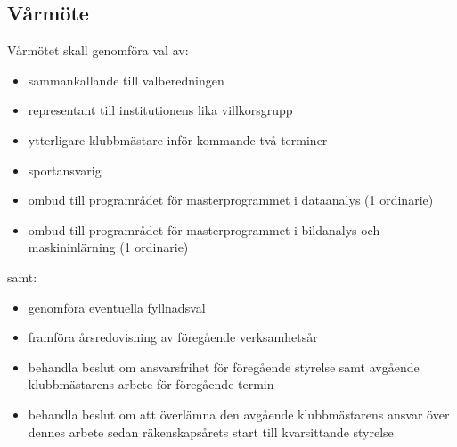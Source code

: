 \documentclass[a4paper]{article}
\begin{document}
  \subsection{Vårmöte}
  Vårmötet skall genomföra val av:
  \begin{itemize}
    \item sammankallande till valberedningen
    \item representant till institutionens lika villkorsgrupp
    \item ytterligare klubbmästare inför kommande två terminer
    \item sportansvarig
    \item ombud till programrådet för masterprogrammet i dataanalys (1 ordinarie)
    \item ombud till programrådet för masterprogrammet i bildanalys och maskininlärning (1 ordinarie)
  \end{itemize}
  samt:
  \begin{itemize}
    \item genomföra eventuella fyllnadsval
    \item framföra årsredovisning av föregående verksamhetsår
    \item behandla beslut om ansvarsfrihet för föregående styrelse samt avgående
      klubbmästarens arbete för föregående termin
    \item behandla beslut om att överlämna den avgående klubbmästarens ansvar
      över dennes arbete sedan räkenskapsårets start till kvarsittande styrelse
  \end{itemize}
\end{document}
